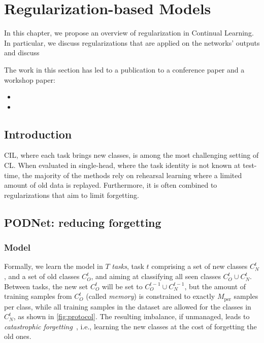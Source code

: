 \chapter{Regularization-based Models}
\label{chapter:regularization}


\begin{chapabstract}
    In this chapter, we propose an overview of regularization in Continual Learning.
    In particular, we discuss regularizations that are applied on the networks' outputs
    and discuss

    The work in this section has led to a publication to a conference paper and a workshop paper:

    \begin{itemize}
        \item {}
        \item {}
    \end{itemize}

\end{chapabstract}



\minitoc
{}


\section{Introduction}

\ac{CIL}, where each task brings new classes, is among the most challenging setting of \ac{CL}.
When evaluated in single-head, where the task identity is not known at test-time,
the majority of the methods rely on rehearsal learning where a limited amount of old data
is replayed. Furthermore, it is often combined to regularizations that aim to limit
forgetting.


\section{PODNet: reducing forgetting}

\subsection{Model}
\label{sec:podnet_model}


Formally, we learn the model in $T$ \textit{tasks}, task $t$ comprising a set of new classes
$C^t_N$, and a set of old classes $C^t_O$, and aiming at classifying all seen classes $C^t_O \cup
    C^t_N$. Between tasks, the new set $C^t_O$ will be set to $C^{t-1}_O \cup C^{t-1}_N$, but the amount
of training samples from $C^t_O$ (called \textit{memory}) is constrained to exactly $M_\mathrm{per}$
samples per class, while all training samples in the dataset are allowed for the classes in $C^t_N$,
as shown in \autoref{fig:protocol}. The resulting imbalance, if unmanaged, leads to
\textit{catastrophic
    forgetting}~\cite{robins1995catastrophicforgetting,french1999catastrophicforgetting}, i.e., learning
the new classes at the cost of forgetting the old ones.


